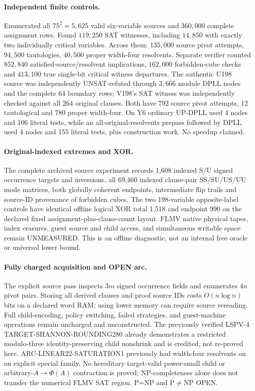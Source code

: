 \documentclass[11pt]{article}
\begin{document}
\paragraph{Independent finite controls.} Enumerated all $75^2=5,625$ valid six-variable sources and $360,000$ complete assignment rows. Found $119,250$ SAT witnesses, including $14,850$ with exactly two individually critical variables. Across them: $135,000$ source pivot attempts, $94,500$ tautologies, $40,500$ proper width-four resolvents. Separate verifier counted $852,840$ satisfied-source/resolvent implications, $162,000$ forbidden-cube checks and $413,100$ true single-bit critical witness departures. The authentic U198 source was independently UNSAT-refuted through $3,666$ module DPLL nodes and the complete 64 boundary rows; V198's SAT witness was independently checked against all 264 original clauses. Both have 792 source pivot attempts, 12 tautological and 780 proper width-four. On Y6 ordinary UP-DPLL used 4 nodes and 106 literal tests, while an all-original-resolvents prepass followed by DPLL used 4 nodes and 155 literal tests, plus construction work. No speedup claimed.
\paragraph{Original-indexed extremes and XOR.} The complete archived source experiment records 1,608 indexed S/U signed occurrence targets and inversions, all 69,460 indexed clause-pair SS/SU/US/UU mode matrices, both globally coherent endpoints, intermediate flip trails and source-ID provenance of forbidden cubes. The two 198-variable opposite-label controls have identical offline logical XOR total 1,518 and endpoint 990 on the declared fixed assignment-plus-clause-count layout. FLMV native physical tapes, index erasures, guest source and child access, and simultaneous writable space remain UNMEASURED. This is an offline diagnostic, not an internal free oracle or universal lower bound.
\paragraph{Fully charged acquisition and OPEN arc.} The explicit source pass inspects $3m$ signed occurrence fields and enumerates $4n$ pivot pairs. Storing all derived clauses and proof source IDs costs $O(n\log n)$ bits on a declared word RAM; using lower memory can require source rereading. Full child-encoding, policy switching, failed strategies, and guest-machine operations remain uncharged and unconstructed. The previously verified LSPV-4 TARGET-SHANNON-ROUNDING280 already demonstrates a restricted modulo-three identity-preserving child nonshrink and is credited, not re-proved here. ARC-LINEAR22-SATURATION1 previously had width-four resolvents on an explicit special family. No hereditary target-valid power-small child or arbitrary-$A\to\Phi(A)$ contraction is proved; NP-completeness alone does not transfer the numerical FLMV SAT region. P=NP and P$\ne$NP OPEN.
\end{document}
